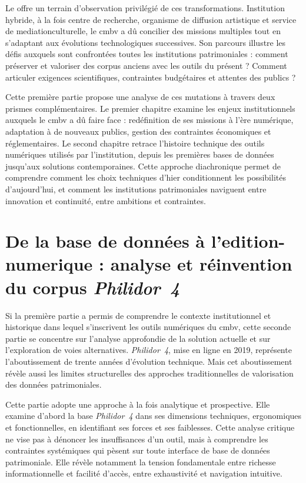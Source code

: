 \documentclass[12pt,twoside]{book}
\begin{document}
	Le  offre un terrain d'observation privilégié de ces transformations. Institution hybride, à la fois centre de recherche, organisme de diffusion artistique et service de \gls{mediationculturelle}, le \gls{cmbv} a dû concilier des missions multiples tout en s'adaptant aux évolutions technologiques successives. Son parcours illustre les défis auxquels sont confrontées toutes les institutions patrimoniales : comment préserver et valoriser des corpus anciens avec les outils du présent ? Comment articuler exigences scientifiques, contraintes budgétaires et attentes des publics ?
	
	Cette première partie propose une analyse de ces mutations à travers deux prismes complémentaires. Le premier chapitre examine les enjeux institutionnels auxquels le \gls{cmbv} a dû faire face : redéfinition de ses missions à l'ère numérique, adaptation à de nouveaux publics, gestion des contraintes économiques et réglementaires. Le second chapitre retrace l'histoire technique des outils numériques utilisés par l'institution, depuis les premières bases de données jusqu'aux solutions contemporaines. Cette approche diachronique permet de comprendre comment les choix techniques d'hier conditionnent les possibilités d'aujourd'hui, et comment les institutions patrimoniales naviguent entre innovation et continuité, entre ambitions et contraintes.
	
	
	
	
	
	\part[De la base de données à l'\gls{edition-numerique}]{De la base de données à l'\gls{edition-numerique} : analyse et réinvention du corpus \textit{Philidor~4}} \label{part2}
	
	Si la première partie a permis de comprendre le contexte institutionnel et historique dans lequel s'inscrivent les outils numériques du \gls{cmbv}, cette seconde partie se concentre sur l'analyse approfondie de la solution actuelle et sur l'exploration de voies alternatives. \textit{Philidor~4}, mise en ligne en 2019, représente l'aboutissement de trente années d'évolution technique. Mais cet aboutissement révèle aussi les limites structurelles des approches traditionnelles de valorisation des données patrimoniales.
	
	Cette partie adopte une approche à la fois analytique et prospective. Elle examine d'abord la base \textit{Philidor~4} dans ses dimensions techniques, ergonomiques et fonctionnelles, en identifiant ses forces et ses faiblesses. Cette analyse critique ne vise pas à dénoncer les insuffisances d'un outil, mais à comprendre les contraintes systémiques qui pèsent sur toute interface de base de données patrimoniale. Elle révèle notamment la tension fondamentale entre richesse informationnelle et facilité d'accès, entre exhaustivité et navigation intuitive.
	
\end{document}
